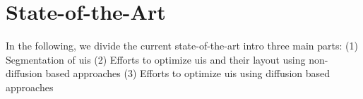 \documentclass[10pt,a4paper]{scrartcl} %
\begin{document}
\section{State-of-the-Art} \label{ch:state-of-the-art}
In the following, we divide the current state-of-the-art intro three main parts:
(1) Segmentation of \acp{ui}
(2) Efforts to optimize \acp{ui} and their layout using non-diffusion based approaches
(3) Efforts to optimize \acp{ui} using diffusion based approaches
\end{document}
